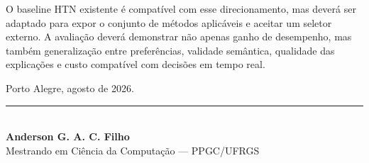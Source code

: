 O baseline HTN existente é compatível com esse direcionamento, mas deverá ser
adaptado para expor o conjunto de métodos aplicáveis e aceitar um seletor
externo.
A avaliação deverá demonstrar não apenas ganho de desempenho, mas também
generalização entre preferências, validade semântica, qualidade das explicações
e custo compatível com decisões em tempo real.

\vspace{3em}
\noindent Porto Alegre, agosto de 2026.

\vspace{4em}
\begin{flushleft}
\rule{7cm}{0.4pt}\\
\textbf{Anderson G. A. C. Filho}\\
Mestrando em Ciência da Computação --- PPGC/UFRGS
\end{flushleft}
